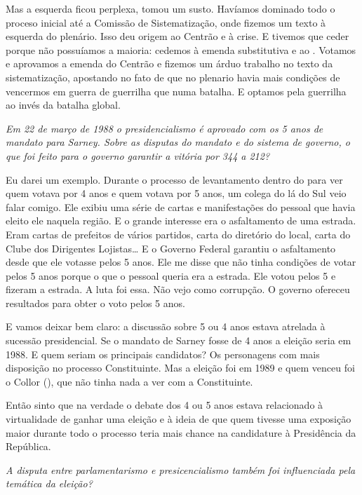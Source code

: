 Mas a esquerda ficou perplexa, tomou um susto. Havíamos dominado todo o
proceso inicial até a Comissão de Sistematização, onde fizemos um texto
à esquerda do plenário. Isso deu origem ao Centrão e à crise. E tivemos
que ceder porque não possuíamos a maioria: cedemos à emenda substitutiva
e ao . Votamos e aprovamos a emenda do Centrão e fizemos um árduo
trabalho no texto da sistematização, apostando no fato de que no
plenario havia mais condições de vencermos em guerra de guerrilha que
numa batalha. E optamos pela guerrilha ao invés da batalha global.

\medskip

\noindent\emph{Em 22 de março de 1988 o presidencialismo é aprovado com os 5 anos de
mandato para Sarney. Sobre as disputas do mandato e do sistema de
governo, o que foi feito para o governo garantir a vitória por 344 a
212?}

Eu darei um exemplo. Durante o processo de levantamento
dentro do  para ver quem votava por 4 anos e quem votava por 5 anos,
um colega do  lá do Sul veio falar comigo. Ele exibiu uma série de
cartas e manifestações do pessoal que havia eleito ele naquela região. E
o grande interesse era o asfaltamento de uma estrada. Eram cartas de
prefeitos de vários partidos, carta do diretório do  local, carta do
Clube dos Dirigentes Lojistas\ldots{} E o Governo Federal garantiu o
asfaltamento desde que ele votasse pelos 5 anos. Ele me disse que não
tinha condições de votar pelos 5 anos porque o que o pessoal queria era
a estrada. Ele votou pelos 5 e fizeram a estrada. A luta foi essa. Não
vejo como corrupção. O governo ofereceu resultados para obter o voto
pelos 5 anos.

E vamos deixar bem claro: a discussão sobre 5 ou 4 anos estava atrelada
à sucessão presidencial. Se o mandato de Sarney fosse de 4 anos a
eleição seria em 1988. E quem seriam os principais candidatos? Os
personagens com mais disposição no processo Constituinte. Mas a eleição
foi em 1989 e quem venceu foi o Collor (), que não tinha nada a ver
com a Constituinte.

Então sinto que na verdade o debate dos 4 ou 5 anos estava relacionado à
virtualidade de ganhar uma eleição e à ideia de que quem tivesse uma
exposição maior durante todo o processo teria mais chance na candidature
à Presidência da República.

\medskip

\noindent\emph{A disputa entre parlamentarismo e presicencialismo também foi
influenciada pela temática da eleição?}

